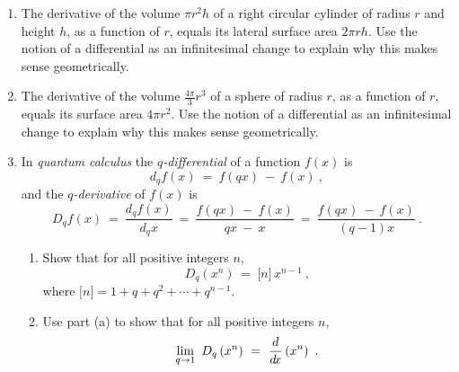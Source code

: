 {\begin{enumerate}[\bfseries 1.]
\begin{enumerate}[\bfseries (a)]
    (which you do not need to prove) is
    \begin{displaymath}
     dG ~=~ V\,\dP ~-~ S\,\dT ~.
    \end{displaymath}
    Use this and part (a) to show that
   \begin{displaymath}
    d\left(\dfrac{G}{RT}\right) ~=~ \dfrac{V}{RT}\,\dP ~-~ \dfrac{H}{RT^2}\,\dT ~.
   \end{displaymath}
  \end{enumerate}
 \item The derivative of the volume $\pi r^2 h$ of a right circular cylinder of
  radius $r$ and height $h$, as a function of $r$, equals its lateral surface
  area $2\pi r h$. Use the notion of a differential as an infinitesimal change
  to explain why this makes sense geometrically.
 \item The derivative of the volume $\frac{4\pi}{3}r^3$ of a sphere of radius
  $r$, as a function of $r$, equals its surface area $4\pi r^2$. Use the notion
  of a differential as an infinitesimal change to explain why this makes sense
  geometrically.
 \item In \emph{quantum calculus} the
  \emph{$q$-differential} of a function
   $f(x)$ is
\[
d_qf(x) ~=~ f(qx) ~-~ f(x) ~,
\]
and the \emph{$q$-derivative} of $f(x)$ is
\[
D_qf(x) ~=~ \frac{d_qf(x)}{d_qx} ~=~ \frac{f(qx) ~-~ f(x)}{qx ~-~ x} ~=~
\frac{f(qx) ~-~ f(x)}{(q - 1)x} ~.
\]
\begin{enumerate}[\bfseries (a)]
 \item Show that for all positive integers $n$,
\[
D_q\left(x^n\right) ~=~ \lbrack n \rbrack\, x^{n-1} ~,
\]
where $\lbrack n \rbrack = 1 + q + q^2 + \cdots + q^{n-1}$.
 \item Use part (a) to show that for all positive integers $n$,
\[
\lim_{q \to 1}~D_q\left(x^n\right) ~=~ \frac{d}{d\!x}\left(x^n\right) ~.
\]
\end{enumerate}
\end{enumerate}
}
